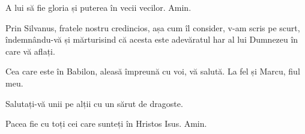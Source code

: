 {A lui să fie gloria și puterea în vecii vecilor. Amin.


\par }{\PP {}Prin Silvanus, fratele nostru credincios, așa cum îl consider, v-am scris pe scurt, îndemnându-vă și mărturisind că acesta este adevăratul har al lui Dumnezeu în care vă aflați.

Cea care este în Babilon, aleasă împreună cu voi, vă salută. La fel și Marcu, fiul meu.

Salutați-vă unii pe alții cu un sărut de dragoste.

\par }{\PP Pacea fie cu toți cei care sunteți în Hristos Isus. Amin.


\par }